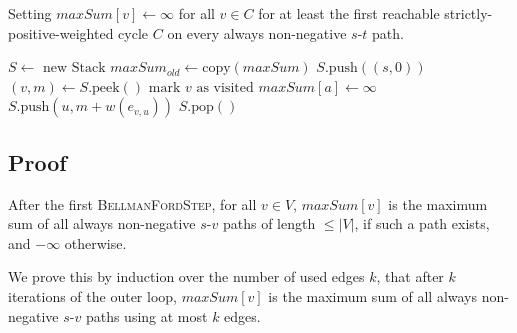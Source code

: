 \documentclass[12pt]{article}
\begin{document}
\begin{algorithm}
  \caption{Setting $\mathit{maxSum}[v] \gets \infty$ for all $v \in C$ for at least the first reachable strictly-positive-weighted cycle $C$ on every always non-negative $s$-$t$ path.}
  \begin{algorithmic}[1]

		\State $S \gets \mbox{ new Stack}$
		\State $\mathit{maxSum}_\mathit{old} \gets \mbox{copy}(\mathit{maxSum})$
		\State $S.\mbox{push}((s, 0))$
			\State $(v, m) \gets S.\mbox{peek}()$
			\State $\mbox{mark $v$ as visited}$
								\State $\mathit{maxSum}[a] \gets \infty$
							\EndFor
						\Else
							\State $S.\mbox{push}(u, m + w(e_{v,u}))$
						\EndIf
					\EndIf
				\EndIf
			\EndFor
			\State $S.\mbox{pop}()$
		\EndWhile
    \EndFunction
  \end{algorithmic}
\end{algorithm}

\subsection*{Proof}

\begin{frm-thm}
After the first \textsc{BellmanFordStep}, for all $v \in V$, $\mathit{maxSum}[v]$ is the maximum sum of all always non-negative $s$-$v$ paths of length $\leq |V|$, if such a path exists, and $-\infty$ otherwise.
\end{frm-thm}

We prove this by induction over the number of used edges $k$, that after $k$ iterations of the outer loop, $\mathit{maxSum}[v]$ is the maximum sum of all always non-negative $s$-$v$ paths using at most $k$ edges.
\end{document}
